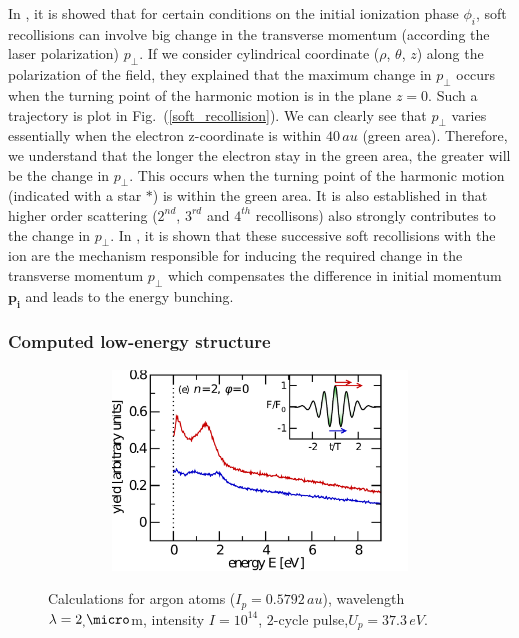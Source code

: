 \documentclass[a4paper]{article}
\begin{document}
In \cite{Liu_2010}, it is showed that for certain conditions on the initial ionization phase $\phi_{i}$, soft recollisions can involve big change in the transverse momentum (according the laser polarization) $p_{\perp}$. If we consider cylindrical coordinate ($\rho$, $\theta$, $z$) along the polarization of the field, they explained that the maximum change in $p_{\perp}$ occurs when the turning point of the harmonic motion is in the plane $z=0$. Such a trajectory is plot in Fig.~(\ref{soft_recollision}). We can clearly see that $p_{\perp}$ varies essentially when the electron z-coordinate is within $40\,au$ (green area). Therefore, we understand that the longer the electron stay in the green area, the greater will be the change in $p_{\perp}$. This occurs when the turning point of the harmonic motion (indicated with a star $*$) is within the green area. It is also established in \cite{Liu_2010} that higher order scattering ($2^{nd}$, $3^{rd}$ and $4^{th}$ recollisons) also strongly contributes to the change in $p_{\perp}$. In \cite{Kastner_2012_soft}, it is shown that these successive soft recollisions with the ion are the mechanism responsible for inducing the required change in the transverse momentum $p_{\perp}$ which compensates the difference in initial momentum $\mathbf{p_{i}}$ and leads to the energy bunching.

\subsubsection{Computed low-energy structure}

\begin{figure}[htp]
\begin{subfigure} [t]{0.5\textwidth}
\hspace{-1cm}
 \includegraphics[width=1.2\textwidth, height=201px]{data/kastner.pdf}
 \label{KastnerLES} 
\end{subfigure}
\begin{subfigure} [t]{0.5\textwidth}
\hspace{-0.5cm}
  \raisebox{17px}{\resizebox{0.983\textwidth}{!}{}}
 \label{myLES} 
\end{subfigure}
 \caption{Calculations for argon atoms ($I_{p}=0.5792\,au$), wavelength $\lambda =2_,\micro$m, intensity $I=10^{14}$, $2$-cycle pulse,$U_{p}=37.3\,eV$. \label{comparison_Kastner_LES}}
\end{figure}
\end{document}
